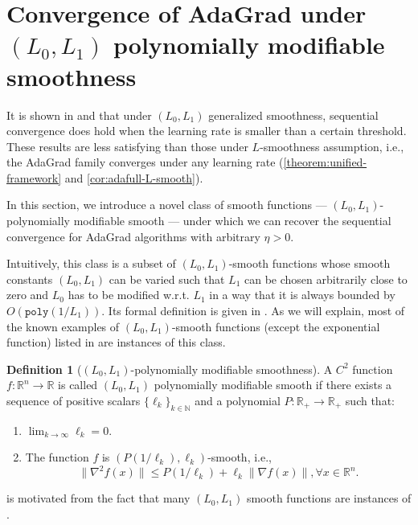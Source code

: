 \documentclass{article}
\theoremstyle{plain}
\theoremstyle{definition}
\newtheorem{definition}[theorem]{Definition}
\theoremstyle{remark}
\newcommand*{\RR}{\mathbb{R}}
\newcommand*{\NN}{\mathbb{N}}
\begin{document}
\section{Convergence of AdaGrad under $(L_0,L_1)$ polynomially modifiable smoothness}
It is shown in  and  that under $(L_0, L_1)$ generalized smoothness, sequential convergence does hold when the learning rate is smaller than a certain threshold. These results are less satisfying than those under $L$-smoothness assumption, i.e., the AdaGrad family converges under any learning rate (\cref{theorem:unified-framework} and \cref{cor:adafull-L-smooth}).

In this section, we introduce a novel class of smooth functions --- $(L_0,L_1)$-polynomially modifiable smooth --- under which we can recover the sequential convergence for AdaGrad algorithms with arbitrary $\eta > 0$.

Intuitively, this class is a subset of $(L_0,L_1)$-smooth functions whose smooth constants $(L_0,L_1)$ can be varied such that $L_1$ can be chosen arbitrarily close to zero and $L_0$ has to be modified w.r.t. $L_1$ in a way that it is always bounded by $O(\mathtt{poly}(1/L_1))$. Its formal definition is given in . 
As we will explain, most of the known examples of $(L_0,L_1)$-smooth functions (except the exponential function) listed in \cite{ZhangKJ2020} are instances of this class.


\begin{definition}[$(L_0,L_1)$-polynomially modifiable smoothness]
    \label{def:smoothness-polynomially-modifiable}
    A $C^2$ function $f: \RR^n \to \RR$ is called $(L_0,L_1)$ polynomially modifiable smooth if there exists a sequence of positive scalars $\{\ell_k\}_{k \in \NN}$ and a polynomial $P:\RR_+ \to \RR_+$ such that:
    \begin{enumerate}
        \item $\lim_{k \to \infty} \ell_k = 0$.
        \item The function $f$ is $(P(1 / \ell_k), \ell_k)$-smooth, i.e.,
        \begin{equation*}
            \|\nabla^2 f(x)\| \leq P(1 / \ell_k) + \ell_k\|\nabla f(x)\|, \forall x \in \RR^n.
        \end{equation*}
    \end{enumerate}
\end{definition}

 is motivated from the fact that many $(L_0,L_1)$ smooth functions are instances of .
\end{document}
